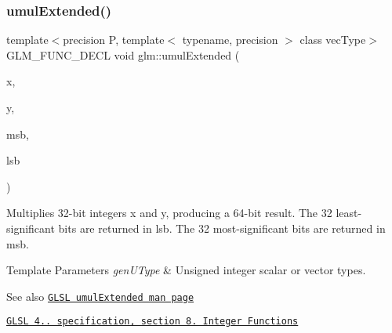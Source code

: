 \subsubsection{\texorpdfstring{umul\+Extended()}{umulExtended()}}
{\footnotesize\ttfamily template$<$precision P, template$<$ typename, precision $>$ class vec\+Type$>$ \\
G\+L\+M\+\_\+\+F\+U\+N\+C\+\_\+\+D\+E\+CL void glm\+::umul\+Extended (\begin{DoxyParamCaption}\item[{vec\+Type$<$ \hyperlink{group__core__precision_ga4fd29415871152bfb5abd588334147c8}{uint}, P $>$ const \&}]{x,  }\item[{vec\+Type$<$ \hyperlink{group__core__precision_ga4fd29415871152bfb5abd588334147c8}{uint}, P $>$ const \&}]{y,  }\item[{vec\+Type$<$ \hyperlink{group__core__precision_ga4fd29415871152bfb5abd588334147c8}{uint}, P $>$ \&}]{msb,  }\item[{vec\+Type$<$ \hyperlink{group__core__precision_ga4fd29415871152bfb5abd588334147c8}{uint}, P $>$ \&}]{lsb }\end{DoxyParamCaption})}

Multiplies 32-\/bit integers x and y, producing a 64-\/bit result. The 32 least-\/significant bits are returned in lsb. The 32 most-\/significant bits are returned in msb.


\begin{DoxyTemplParams}{Template Parameters}
{\em gen\+U\+Type} & Unsigned integer scalar or vector types.\\
\hline
\end{DoxyTemplParams}
\begin{DoxySeeAlso}{See also}
\href{http://www.opengl.org/sdk/docs/manglsl/xhtml/umulExtended.xml}{\tt G\+L\+SL umul\+Extended man page} 

\href{http://www.opengl.org/registry/doc/GLSLangSpec.4.20.8.pdf}{\tt G\+L\+SL 4.. specification, section 8. Integer Functions} 
\end{DoxySeeAlso}
\mbox{\label{group__core__func__integer_ga22a889bf08313b7e547e2cdb8bb15ee4}} 
